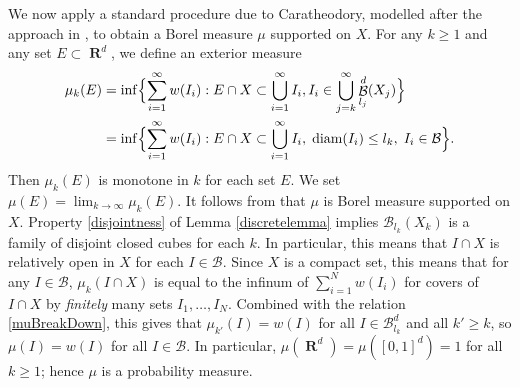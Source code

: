 \documentclass[dvipsnames,letterpaper,12pt]{article}
\numberwithin{equation}{section}
\theoremstyle{plain}
\theoremstyle{remark}
\DeclareMathOperator{\RR}{\mathbf{R}}
\DeclareMathOperator{\B}{\mathcal{B}}
\begin{document}
We now apply a standard procedure due to Caratheodory, modelled after the approach in \cite[Theorem 4.2]{Mattila}, to obtain a Borel measure $\mu$ supported on $X$. For any $k \geq 1$ and any set $E \subset \RR^d$, we define an exterior measure
%
\begin{align*}  \mu_k(E) &= \inf \Bigl\{ \sum_{i = 1}^\infty w(I_i) : E \cap X \subset \bigcup_{i = 1}^\infty I_i, I_i \in \bigcup_{j = k}^\infty \B_{l_j}^d(X_j) \Bigr\} \\  
&= \inf \Bigl\{ \sum_{i = 1}^\infty w(I_i) : E \cap X \subset \bigcup_{i = 1}^\infty I_i, \; \text{diam}(I_i) \leq l_k, \; I_i \in \mathcal B \Bigr\}.
\end{align*}
%
Then $\mu_k(E)$ is monotone in $k$ for each set $E$. We set $\mu(E) = \lim_{k \to \infty} \mu_k(E)$. It follows from \cite[Theorem 4.2]{Mattila} that $\mu$ is Borel measure supported on $X$. Property \ref{disjointness} of Lemma \ref{discretelemma} implies $\mathcal{B}_{l_k}(X_k)$ is a family of disjoint closed cubes for each $k$. In particular, this means that $I \cap X$ is relatively open in $X$ for each $I \in \mathcal{B}$. Since $X$ is a compact set, this means that for any $I \in \mathcal{B}$, $\mu_k(I \cap X)$ is equal to the infinum of $\sum_{i = 1}^N w(I_i)$ for covers of $I \cap X$ by \emph{finitely} many sets $I_1, \dots, I_N$. Combined with the relation \eqref{muBreakDown}, this gives that $\mu_{k'}(I) = w(I)$ for all $I \in \mathcal{B}_{l_k}^d$ and all $k' \geq k$, so $\mu(I) = w(I)$ for all $I \in \mathcal{B}$. In particular, $\mu(\RR^d) = \mu([0,1]^d) = 1$ for all $k \geq 1$; hence $\mu$ is a probability measure.

\end{document}
